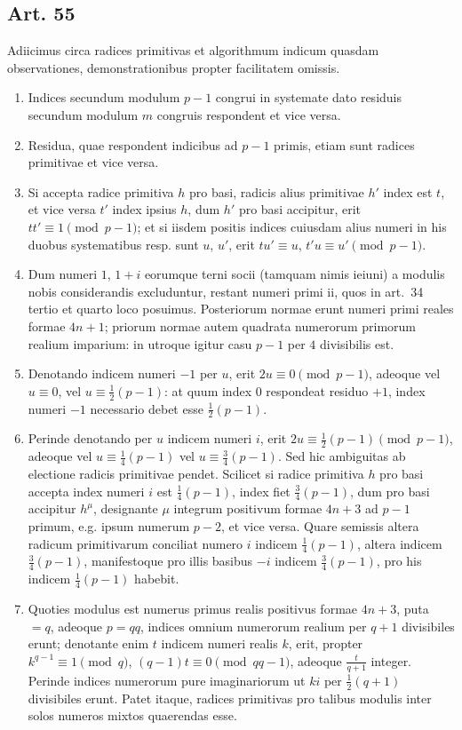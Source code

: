 \documentclass[12pt]{article}
\newcommand{\art}[1]{\subsection*{Art. #1}}
\begin{document}
\art{55}
Adiicimus circa radices primitivas et algorithmum indicum quasdam observationes, demonstrationibus propter facilitatem omissis.

\begin{enumerate}[label=\Roman*.]
\item Indices secundum modulum $p-1$ congrui in systemate dato residuis secundum modulum $m$ congruis respondent et vice versa.
\item Residua, quae respondent indicibus ad $p-1$ primis, etiam sunt radices primitivae et vice versa.
\item Si accepta radice primitiva $h$ pro basi, radicis alius primitivae $h'$ index est $t$, et vice versa $t'$ index ipsius $h$, dum $h'$ pro basi accipitur, erit $tt'\equiv 1\pmod{p-1}$; et si iisdem positis indices cuiusdam alius numeri in his duobus systematibus resp. sunt $u$, $u'$, erit $tu'\equiv u$, $t'u\equiv u'\pmod{p-1}$.
\item Dum numeri $1$, $1+i$ eorumque terni socii (tamquam nimis ieiuni) a modulis nobis considerandis excluduntur, restant numeri primi ii, quos in art.~34 tertio et quarto loco posuimus. Posteriorum normae erunt numeri primi reales formae $4n+1$; priorum normae autem quadrata numerorum primorum realium imparium: in utroque igitur casu $p-1$ per $4$ divisibilis est.
\item Denotando indicem numeri $-1$ per $u$, erit $2u\equiv0\pmod{p-1}$, adeoque vel $u\equiv0$, vel $u\equiv\frac12(p-1)$: at quum index $0$ respondeat residuo $+1$, index numeri $-1$ necessario debet esse $\frac12(p-1)$.
\item Perinde denotando per $u$ indicem numeri $i$, erit $2u\equiv\frac12(p-1)\pmod{p-1}$, adeoque vel $u\equiv\frac14(p-1)$ vel $u\equiv\frac34(p-1)$. Sed hic ambiguitas ab electione radicis primitivae pendet. Scilicet si radice primitiva $h$ pro basi accepta index numeri $i$ est $\frac14(p-1)$, index fiet $\frac34(p-1)$, dum pro basi accipitur $h^\mu$, designante $\mu$ integrum positivum formae $4n+3$ ad $p-1$ primum, e.g. ipsum numerum $p-2$, et vice versa. Quare semissis altera radicum primitivarum conciliat numero $i$ indicem $\frac14(p-1)$, altera indicem $\frac34(p-1)$, manifestoque pro illis basibus $-i$ indicem $\frac34(p-1)$, pro his indicem $\frac14(p-1)$ habebit.
\item Quoties modulus est numerus primus realis positivus formae $4n+3$, puta $=q$, adeoque $p=qq$, indices omnium numerorum realium per $q+1$ divisibiles erunt; denotante enim $t$ indicem numeri realis $k$, erit, propter $k^{q-1}\equiv1\pmod q$, $(q-1)t\equiv0\pmod{qq-1}$, adeoque $\frac{t}{q+1}$ integer. Perinde indices numerorum pure imaginariorum ut $ki$ per $\frac12(q+1)$ divisibiles erunt. Patet itaque, radices primitivas pro talibus modulis inter solos numeros mixtos quaerendas esse.

\end{enumerate}
\end{document}
